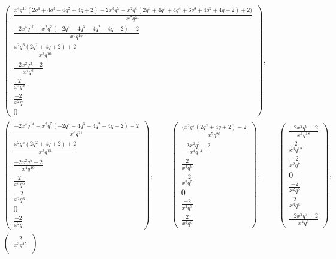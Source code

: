 \documentclass[pdftex]{sigma}
\numberwithin{equation}{section}
\begin{document}
\begin{gather*}
 \begin{pmatrix}
 \frac{x^4q^{10}(2q^4 + 4q^3 + 6q^2 + 4q + 2) + 2x^3q^9 + x^2q^3(2q^6 + 4q^5 + 4q^4 + 6q^3 + 4q^2 + 4q + 2)+2)}{x^7q^{21}} \\[1mm]
 \frac{-2x^4q^{10} +x^2q^3(- 2q^4 - 4q^3 - 4q^2 - 4q - 2) - 2}{x^6q^{15}} \\[1mm]
 \frac{x^2q^3(2q^2 + 4q + 2) + 2}{x^5q^{10}} \\[1mm]
 \frac{-2x^2q^3 - 2}{x^4q^6} \\[1mm]
 \frac{2}{x^3q^3} \\[1mm]
 \frac{-2}{x^2q} \\
 0
 \end{pmatrix} ,\\
 \begin{pmatrix}
 \frac{-2x^4q^{14} + x^2q^5(- 2q^4 - 4q^3 - 4q^2 - 4q - 2) - 2}{x^6q^{21}} \\[1mm]
 \frac{x^2q^5(2q^2 + 4q + 2) + 2}{x^5q^{15}} \\[1mm]
 \frac{-2x^2q^{5} - 2}{x^4q^{10}} \\[1mm]
 \frac{2}{x^3q^6} \\[1mm]
 \frac{-2}{x^2q^3} \\
 0 \\
 \frac{-2}{x^2q}
 \end{pmatrix} ,\qquad
 \begin{pmatrix}
 \frac{(x^2q^7(2q^2 + 4q + 2) + 2}{x^5q^{20}} \\[1mm]
 \frac{-2x^2q^7 - 2}{x^4q^{14}} \\[1mm]
 \frac{2}{x^3q^9} \\[1mm]
 \frac{-2}{x^2q^5} \\
 0 \\
 \frac{-2}{x^2q^3} \\[1mm]
 \frac{2}{x^3q^3}
 \end{pmatrix} ,\qquad
 \begin{pmatrix}
 \frac{-2x^2q^9 - 2}{x^4q^{18}} \\[1mm]
 \frac{2}{x^3q^{12}} \\[1mm]
 \frac{-2}{x^2q^7} \\
 0 \\
 \frac{-2}{x^2q^5} \\[1mm]
 \frac{2}{x^3q^6} \\[1mm]
 \frac{-2x^2q^3 - 2}{x^4q^6}
 \end{pmatrix} ,\\
 \begin{pmatrix}
 \frac{2}{x^3q^{15}} \\[1mm]

\end{pmatrix}
\end{gather*}
\end{document}
